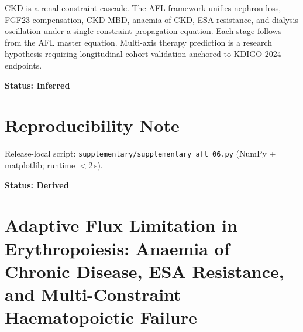 \documentclass[12pt,a4paper]{article}
\begin{document}
CKD is a renal constraint cascade. The AFL framework unifies nephron loss, FGF23 compensation, CKD-MBD, anaemia of CKD, ESA resistance, and dialysis oscillation under a single constraint-propagation equation. Each stage follows from the AFL master equation. Multi-axis therapy prediction is a research hypothesis requiring longitudinal cohort validation anchored to KDIGO 2024 endpoints.

\textbf{Status: Inferred}

\section{Reproducibility Note}

Release-local script: \texttt{supplementary/supplementary\_afl\_06.py} (NumPy + matplotlib; runtime $< 2$\,s).

\textbf{Status: Derived}
\clearpage
\section*{Adaptive Flux Limitation in Erythropoiesis: Anaemia of Chronic Disease, ESA Resistance, and Multi-Constraint Haematopoietic Failure}




\end{document}
